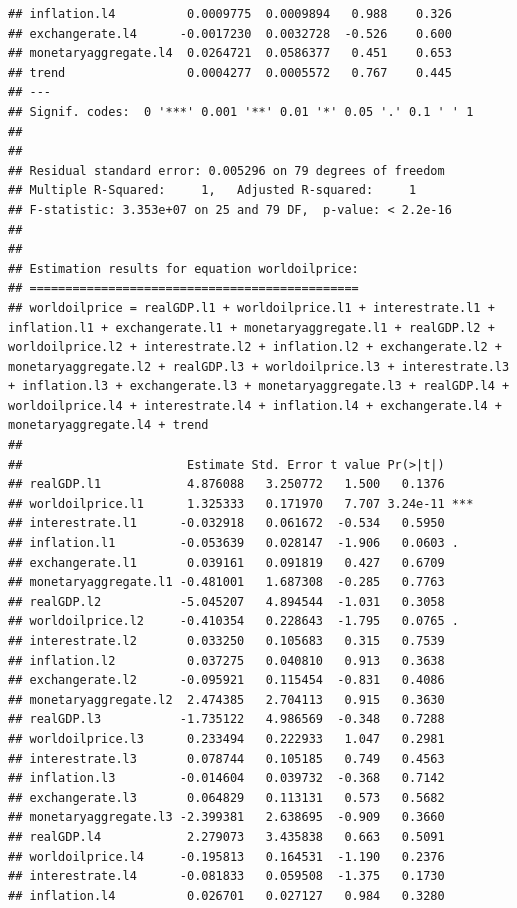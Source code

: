 \documentclass[11pt,preprint, authoryear]{elsarticle}
\numberwithin{equation}{section}
\numberwithin{figure}{section}
\numberwithin{table}{section}
\begin{document}
\begin{verbatim}
## inflation.l4          0.0009775  0.0009894   0.988    0.326    
## exchangerate.l4      -0.0017230  0.0032728  -0.526    0.600    
## monetaryaggregate.l4  0.0264721  0.0586377   0.451    0.653    
## trend                 0.0004277  0.0005572   0.767    0.445    
## ---
## Signif. codes:  0 '***' 0.001 '**' 0.01 '*' 0.05 '.' 0.1 ' ' 1
## 
## 
## Residual standard error: 0.005296 on 79 degrees of freedom
## Multiple R-Squared:     1,   Adjusted R-squared:     1 
## F-statistic: 3.353e+07 on 25 and 79 DF,  p-value: < 2.2e-16 
## 
## 
## Estimation results for equation worldoilprice: 
## ============================================== 
## worldoilprice = realGDP.l1 + worldoilprice.l1 + interestrate.l1 + inflation.l1 + exchangerate.l1 + monetaryaggregate.l1 + realGDP.l2 + worldoilprice.l2 + interestrate.l2 + inflation.l2 + exchangerate.l2 + monetaryaggregate.l2 + realGDP.l3 + worldoilprice.l3 + interestrate.l3 + inflation.l3 + exchangerate.l3 + monetaryaggregate.l3 + realGDP.l4 + worldoilprice.l4 + interestrate.l4 + inflation.l4 + exchangerate.l4 + monetaryaggregate.l4 + trend 
## 
##                       Estimate Std. Error t value Pr(>|t|)    
## realGDP.l1            4.876088   3.250772   1.500   0.1376    
## worldoilprice.l1      1.325333   0.171970   7.707 3.24e-11 ***
## interestrate.l1      -0.032918   0.061672  -0.534   0.5950    
## inflation.l1         -0.053639   0.028147  -1.906   0.0603 .  
## exchangerate.l1       0.039161   0.091819   0.427   0.6709    
## monetaryaggregate.l1 -0.481001   1.687308  -0.285   0.7763    
## realGDP.l2           -5.045207   4.894544  -1.031   0.3058    
## worldoilprice.l2     -0.410354   0.228643  -1.795   0.0765 .  
## interestrate.l2       0.033250   0.105683   0.315   0.7539    
## inflation.l2          0.037275   0.040810   0.913   0.3638    
## exchangerate.l2      -0.095921   0.115454  -0.831   0.4086    
## monetaryaggregate.l2  2.474385   2.704113   0.915   0.3630    
## realGDP.l3           -1.735122   4.986569  -0.348   0.7288    
## worldoilprice.l3      0.233494   0.222933   1.047   0.2981    
## interestrate.l3       0.078744   0.105185   0.749   0.4563    
## inflation.l3         -0.014604   0.039732  -0.368   0.7142    
## exchangerate.l3       0.064829   0.113131   0.573   0.5682    
## monetaryaggregate.l3 -2.399381   2.638695  -0.909   0.3660    
## realGDP.l4            2.279073   3.435838   0.663   0.5091    
## worldoilprice.l4     -0.195813   0.164531  -1.190   0.2376    
## interestrate.l4      -0.081833   0.059508  -1.375   0.1730    
## inflation.l4          0.026701   0.027127   0.984   0.3280    

\end{verbatim}
\end{document}
